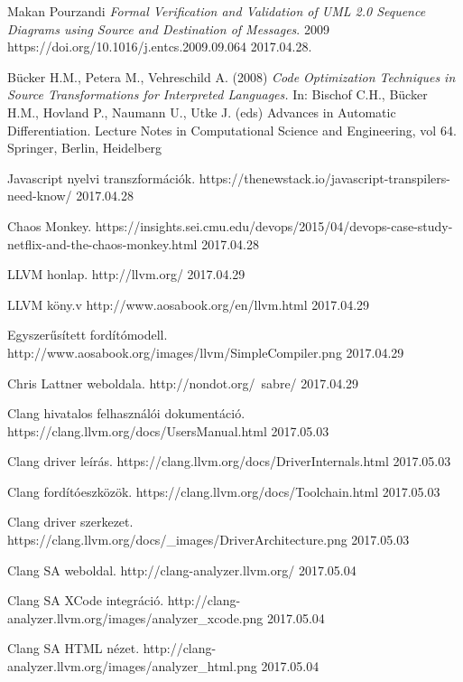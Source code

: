 \documentclass[a4paper,12pt]{report}
\begin{document}
\begin{thebibliography}{1}

 Makan Pourzandi {\em Formal Verification and Validation of UML
2.0 Sequence Diagrams using Source and
Destination of Messages}.  2009 https://doi.org/10.1016/j.entcs.2009.09.064 2017.04.28.

 Bücker H.M., Petera M., Vehreschild A. (2008) {\em Code Optimization Techniques in Source Transformations for Interpreted Languages.} In: Bischof C.H., Bücker H.M., Hovland P., Naumann U., Utke J. (eds) Advances in Automatic Differentiation. Lecture Notes in Computational Science and Engineering, vol 64. Springer, Berlin, Heidelberg

 Javascript nyelvi transzformációk. https://thenewstack.io/javascript-transpilers-need-know/ 2017.04.28

 Chaos Monkey. https://insights.sei.cmu.edu/devops/2015/04/devops-case-study-netflix-and-the-chaos-monkey.html 2017.04.28

 LLVM honlap. http://llvm.org/ 2017.04.29

 LLVM köny.v http://www.aosabook.org/en/llvm.html 2017.04.29

 Egyszerűsített fordítómodell. http://www.aosabook.org/images/llvm/SimpleCompiler.png 2017.04.29

 Chris Lattner weboldala. http://nondot.org/~sabre/ 2017.04.29

 Clang hivatalos felhasználói dokumentáció. https://clang.llvm.org/docs/UsersManual.html 2017.05.03

 Clang driver leírás. https://clang.llvm.org/docs/DriverInternals.html 2017.05.03

 Clang fordítóeszközök. https://clang.llvm.org/docs/Toolchain.html 2017.05.03

 Clang driver szerkezet. https://clang.llvm.org/docs/\_images/DriverArchitecture.png 2017.05.03

 Clang SA weboldal. http://clang-analyzer.llvm.org/ 2017.05.04

 Clang SA XCode integráció. http://clang-analyzer.llvm.org/images/analyzer\_xcode.png 2017.05.04

 Clang SA HTML nézet. http://clang-analyzer.llvm.org/images/analyzer\_html.png 2017.05.04


\end{thebibliography}
\end{document}
